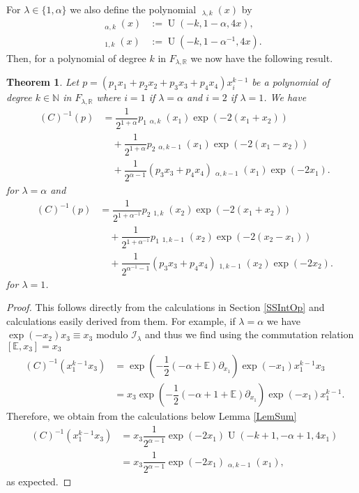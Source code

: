 \documentclass{amsart}
\newtheorem{theorem}{Theorem}
\numberwithin{theorem}{section}
\theoremstyle{definition}
\theoremstyle{remark}
\def\R{\mathds{R} }
\def\E{\mathds{E} }
\DeclareMathOperator{\KU}{U}
\DeclareMathOperator{\KO}{\widetilde U}
\DeclareMathOperator{\KV}{\widetilde V}
\newcommand{\iSB}{\pil(C)^{-1}}
\newcommand{\pt}[1]{\partial_{#1}}
\newcommand{\ds}[1]{\mathds{#1}}
\newcommand{\mc}[1]{\mathcal{#1}}
\DeclareMathOperator{\pil}{\pi_\lambda}
\begin{document}
For $\lambda\in\{1,\alpha\}$ we also define the polynomial $\KV_{\lambda,k}(x)$ by
\begin{align*}
\KV_{\alpha,k}(x) &:= \KU(-k,1-\alpha,4x),\\
\KV_{1,k}(x) &:=  \KU(-k,1-\alpha^{-1},4x).
\end{align*}
Then, for a polynomial of degree $k$ in $F_{\lambda,\R}$ we now have the following result.

\begin{theorem}\label{CorMon}
Let $p = (p_1 x_1 + p_2 x_2 + p_3 {x_3} + p_4 {x_4})x_i^{k-1}$ be a polynomial of degree $k\in \ds N$ in $F_{\lambda,\R}$ where $i=1$ if $\lambda=\alpha$ and $i=2$ if $\lambda=1$. We have
\begin{align*}
\iSB(p) &= \dfrac{1}{2^{1+\alpha}}p_1 \KO_{\alpha,k}(x_1)\exp(-2(x_1+x_2))\\
&\quad + \dfrac{1}{2^{1+\alpha}}p_2 \KO_{\alpha,k-1}(x_1)\exp(-2(x_1-x_2))\\
&\quad + \dfrac{1}{2^{\alpha-1}}(p_3 {x_3} + p_4 {x_4})\KV_{\alpha,k-1}(x_1)\exp(-2x_1).
\end{align*}
for $\lambda=\alpha$ and
\begin{align*}
\iSB(p) &= \dfrac{1}{2^{1+\alpha^{-1}}}p_2 \KO_{1,k}(x_2)\exp(-2(x_1+x_2))\\
&\quad + \dfrac{1}{2^{1+\alpha^{-1}}}p_1 \KO_{1,k-1}(x_2)\exp(-2(x_2-x_1))\\
&\quad + \dfrac{1}{2^{\alpha^{-1}-1}}(p_3 {x_3} + p_4 {x_4})\KV_{1,k-1}(x_2)\exp(-2x_2).
\end{align*}
for $\lambda=1$.
\end{theorem}

\begin{proof}
This follows directly from the calculations in Section \ref{SSIntOp} and calculations easily derived from them. For example, if $\lambda = \alpha$ we have $\exp(-x_2) x_3 \equiv x_3$  modulo $\mc I_\lambda$ and thus we find using the commutation relation $[\E,x_3]=x_3$ 
\begin{align*}
\iSB(x_1^{k-1}x_3) &= \exp(-\dfrac{1}{2}(-\alpha + \E)\pt {x_1})\exp(-x_1)x_1^{k-1}x_3\\
&= x_3\exp(-\dfrac{1}{2}(-\alpha +1 + \E)\pt {x_1})\exp(-x_1)x_1^{k-1}.
\end{align*}
Therefore, we obtain from the calculations below Lemma \ref{LemSum}
\begin{align*}
\iSB(x_1^{k-1}x_3) &= x_3\dfrac{1}{2^{\alpha-1}}\exp(-2x_1)\KU(-k+1,-\alpha+1,4x_1)\\
&= x_3\dfrac{1}{2^{\alpha-1}}\exp(-2x_1)\KV_{\alpha,k-1}(x_1),
\end{align*}
as expected.
\end{proof}
\end{document}

